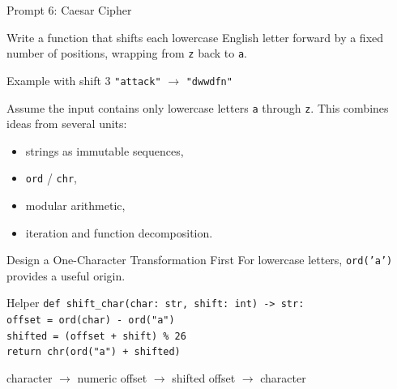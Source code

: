 \documentclass[aspectratio=169,10pt]{beamer}
\begin{document}
\begin{frame}{Prompt 6: Caesar Cipher}
  \begin{activity}
    Write a function that shifts each lowercase English letter forward by a fixed number of positions, wrapping from \texttt{z} back to \texttt{a}.
  \end{activity}

  \begin{block}{Example with shift 3}
    \texttt{"attack"} $\longrightarrow$ \texttt{"dwwdfn"}
  \end{block}

  Assume the input contains only lowercase letters \texttt{a} through \texttt{z}. This combines ideas from several units:
  \begin{itemize}
    \item strings as immutable sequences,
    \item \texttt{ord} / \texttt{chr},
    \item modular arithmetic,
    \item iteration and function decomposition.
  \end{itemize}
\end{frame}

\begin{frame}{Design a One-Character Transformation First}
  For lowercase letters, \texttt{ord('a')} provides a useful origin.

  \begin{block}{Helper}
    \texttt{def shift\_char(char: str, shift: int) -> str:}\\
    \hspace*{0.20in}\texttt{offset = ord(char) - ord("a")}\\
    \hspace*{0.20in}\texttt{shifted = (offset + shift) \% 26}\\
    \hspace*{0.20in}\texttt{return chr(ord("a") + shifted)}
  \end{block}

  \begin{center}
    character $\rightarrow$ numeric offset $\rightarrow$ shifted offset $\rightarrow$ character
  \end{center}
\end{frame}
\end{document}
